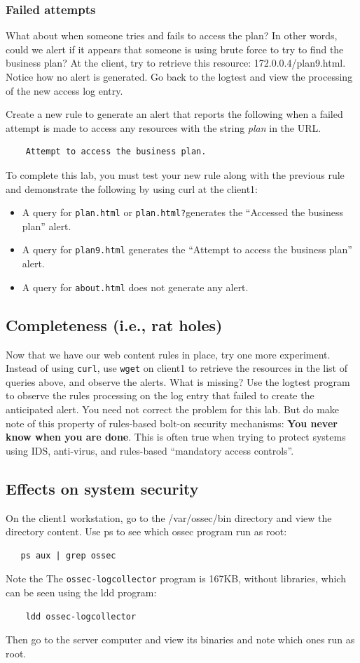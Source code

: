 \subsubsection{Failed attempts}
What about when someone tries
and fails to access the plan?  In other words, could we alert if it appears that someone is using brute force to try
to find the business plan?  At the client, try to retrieve this resource: 172.0.0.4/plan9.html.  Notice how no alert is
generated.  Go back to the logtest and view the processing of the new access log entry.

Create a new rule to generate an alert that reports the following when a failed attempt is made to access any 
resources with the string \textit{plan} in the URL.
\begin{verbatim}
    Attempt to access the business plan.
\end{verbatim}


\noindent To complete this lab, you must test your new rule along with the previous rule and demonstrate the following
by using curl at the client1:
\begin{itemize}
\item A query for {\tt plan.html} or {\tt plan.html?}generates the ``Accessed the business plan'' alert.
\item A query for {\tt plan9.html} generates the ``Attempt to access the business plan'' alert.
\item A query for {\tt about.html} does not generate any alert.
\end{itemize}

\subsection{Completeness (i.e., rat holes)}
Now that we have our web content rules in place, try one more experiment.  Instead of using {\tt curl},
use {\tt wget} on client1 to retrieve the resources in the list of queries above, and observe the alerts.  What is missing?
Use the logtest program to observe the rules processing on the log entry that failed to create the anticipated 
alert.  You need not correct the problem for this lab.  But do make note of this property of rules-based bolt-on
security mechanisms:  \textbf{You never know when you are done}.   This is often true when trying to protect
systems using IDS, anti-virus,
and rules-based ``mandatory access controls''.  

\subsection{Effects on system security}
On the client1 workstation, go to the /var/ossec/bin directory and view the directory content.  Use ps to see which 
ossec program run as root:
\begin{verbatim}
   ps aux | grep ossec
\end{verbatim} Note the
The {\tt ossec-logcollector} program is 167KB, without libraries, which can be seen using the ldd program:
\begin{verbatim}
    ldd ossec-logcollector
\end{verbatim}
Then go to the server computer and view its binaries and note which ones run as root.

